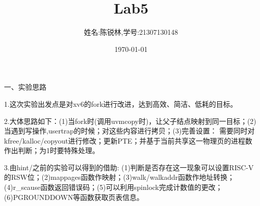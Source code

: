 \documentclass[12pt]{article}
\title{Lab5}
\author{姓名:陈锐林,学号:21307130148}
\date{\today}
\begin{document}
\maketitle
\begin{Large}
	\noindent 一、实验思路\par
\end{Large}
1.这次实验出发点是对xv6的fork进行改进，达到高效、简洁、低耗的目标。\par
2.大体思路如下：(1)当fork时(调用uvmcopy时)，让父子结点映射到同一目标；(2)当遇到写操作,usertrap的时候；对这些内容进行拷贝；(3)完善设置：
需要同时对kfree/kalloc/copyout进行修改；更新PTE；并基于当前共享这一物理页的进程数作出判断；为1时要特殊处理。\par
3.由hint/之前的实验可以得到的借助: (1)判断是否存在这一现象可以设置RISC-V的RSW位；(2)mappages函数作映射；(3)walk/walkaddr函数作地址转换；(4)r\_scause函数返回错误码；(5)可以利用spinlock完成计数值的更改；(6)PGROUNDDOWN等函数获取页表信息。\\
\end{document}
